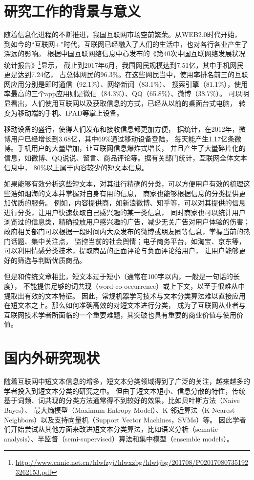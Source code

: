 \documentclass{standalone}
\begin{document}
\thesischapterexordium
\section{研究工作的背景与意义}

随着信息化进程的不断推进，我国互联网市场空前繁荣。从WEB2.0时代开始，
到如今的“互联网+”时代，互联网已经融入了人们的生活中，也对各行各业产生了深远的影响。
根据中国互联网络信息中心发布的《第40次中国互联网络发展状况统计报告》\footnote{\url{http://www.cnnic.net.cn/hlwfzyj/hlwxzbg/hlwtjbg/201708/P020170807351923262153.pdf}}显示，
截止到2017年6月，我国网民规模达到7.51亿，其中手机网民更是达到7.24亿，
占总体网民的96.3\%。在这些网民当中，使用率排名前三的互联网应用分别是即时通信（92.1\%）、网络新闻（83.1\%）、
搜索引擎（81.1\%），使用率最高的三个app应用则是微信（84.3\%）、QQ（65.8\%）、微博（38.7\%）。
可以明显看出，人们使用互联网以及获取信息的方式，已经从以前的桌面台式电脑，
转变为移动端的手机、IPAD等掌上设备。

移动设备的盛行，使得人们发布和接收信息都更加方便，
据统计，在2012年，微博用户已经增长到3.68亿，其中69\%通过移动设备登陆，
每天能产生1.17亿条微博。手机用户的大量增加，让互联网信息爆炸式增长，
并且产生了大量碎片化的信息，如微博、QQ说说、留言、商品评论等。据有关部门统计，互联网全体文本信息中，
80\%以上属于内容较少的短文本信息。

如果能够有效分析这些短文本，对其进行精确的分类，可以方便用户有效的梳理这些浩如烟海的文本并掌握对自身有用的信息，
商家也能够根据信息的分类提供更加优质的服务。
例如，内容提供商，如新浪微博、知乎等，可以对其提供的信息进行分类，让用户快速获取自己感兴趣的某一类信息，
同时商家也可以统计用户浏览过的信息类，精确投放用户感兴趣的广告，减少无关广告对用户体验的伤害；
政府相关部门可以根据一段时间内大众发布的微博或朋友圈等信息，掌握当前的热门话题、集中关注点，
监控当前的社会舆情；电子商务平台，如淘宝、京东等，可以利用情感分类技术，提取商品的正面评论与负面评论给用户，
让用户能够更好的筛选与判断优质商品。

但是和传统文章相比，短文本过于短小（通常在100字以内，一般是一句话的长度），
不能提供足够的词共现（word co-occurrence）或上下文，以至于很难从中提取出有效的文本特征。
因此，常规机器学习技术与文本分类算法难以直接应用在短文本之上。那么如何准确高效的对短文本进行分类，
成为了互联网从业者与互联网技术学者所面临的一个重要难题，其突破也具有重要的商业价值与使用价值。

\section{国内外研究现状}
\label{research_status}
随着互联网中短文本信息的增多，短文本分类领域得到了广泛的关注，越来越多的学者投入到短文本分类的研究之中。
但由于短文本短小、信息分散的特性，传统基于词频、词共现的分类方法通常得不到较好的效果，比如贝叶斯方法（Naive Bayes）、
最大熵模型（Maximum Entropy Model）、K-邻近算法（K Nearest Neighbors）以及支持向量机（Support Vector Machines，SVMs）等。
因此学者们开始尝试从其他方面来改进短文本分类算法，比如语义分析（sematic analysis）、半监督（semi-supervised）算法和集中模型（ensemble models）。
\end{document}
